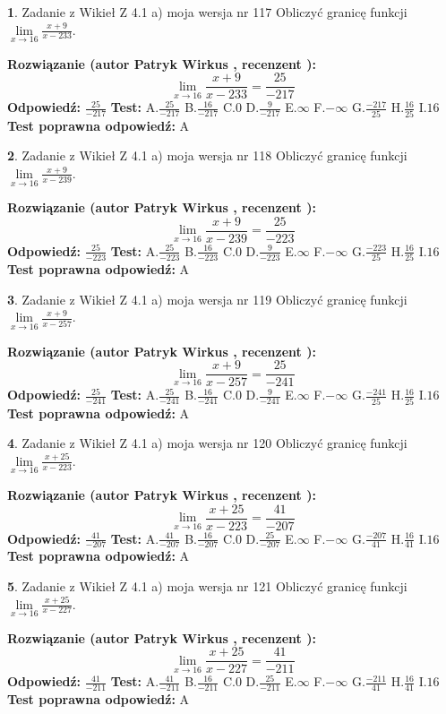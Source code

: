 \documentclass[12pt, a4paper]{article}
\theoremstyle{definition} %
\newtheorem{zad}{}
\newcommand{\zadStart}[1]{\begin{zad}#1\newline}
\newcommand{\zadStop}{\end{zad}}
\newcommand{\rozwStart}[2]{\noindent \textbf{Rozwiązanie (autor #1 , recenzent #2): }\newline}
\newcommand{\rozwStop}{\newline}
\newcommand{\odpStart}{\noindent \textbf{Odpowiedź:}\newline}
\newcommand{\odpStop}{\newline}
\newcommand{\testStart}{\noindent \textbf{Test:}\newline}
\newcommand{\testStop}{\newline}
\newcommand{\kluczStart}{\noindent \textbf{Test poprawna odpowiedź:}\newline}
\newcommand{\kluczStop}{\newline}
\begin{document}
\zadStart{Zadanie z Wikieł Z 4.1 a) moja wersja nr 117}
Obliczyć granicę funkcji $\lim\limits_{x\to16}\frac{x+9}{x-233}$.
\zadStop
\rozwStart{Patryk Wirkus}{}
$$\lim\limits_{x\to16}\frac{x+9}{x-233} = \frac{25}{-217}$$
\rozwStop
\odpStart
$\frac{25}{-217}$
\odpStop
\testStart
A.$\frac{25}{-217}$
B.$\frac{16}{-217}$
C.$0$
D.$\frac{9}{-217}$
E.$\infty$
F.$-\infty$
G.$\frac{-217}{25}$
H.$\frac{16}{25}$
I.$16$
\testStop
\kluczStart
A
\kluczStop



\zadStart{Zadanie z Wikieł Z 4.1 a) moja wersja nr 118}
Obliczyć granicę funkcji $\lim\limits_{x\to16}\frac{x+9}{x-239}$.
\zadStop
\rozwStart{Patryk Wirkus}{}
$$\lim\limits_{x\to16}\frac{x+9}{x-239} = \frac{25}{-223}$$
\rozwStop
\odpStart
$\frac{25}{-223}$
\odpStop
\testStart
A.$\frac{25}{-223}$
B.$\frac{16}{-223}$
C.$0$
D.$\frac{9}{-223}$
E.$\infty$
F.$-\infty$
G.$\frac{-223}{25}$
H.$\frac{16}{25}$
I.$16$
\testStop
\kluczStart
A
\kluczStop



\zadStart{Zadanie z Wikieł Z 4.1 a) moja wersja nr 119}
Obliczyć granicę funkcji $\lim\limits_{x\to16}\frac{x+9}{x-257}$.
\zadStop
\rozwStart{Patryk Wirkus}{}
$$\lim\limits_{x\to16}\frac{x+9}{x-257} = \frac{25}{-241}$$
\rozwStop
\odpStart
$\frac{25}{-241}$
\odpStop
\testStart
A.$\frac{25}{-241}$
B.$\frac{16}{-241}$
C.$0$
D.$\frac{9}{-241}$
E.$\infty$
F.$-\infty$
G.$\frac{-241}{25}$
H.$\frac{16}{25}$
I.$16$
\testStop
\kluczStart
A
\kluczStop



\zadStart{Zadanie z Wikieł Z 4.1 a) moja wersja nr 120}
Obliczyć granicę funkcji $\lim\limits_{x\to16}\frac{x+25}{x-223}$.
\zadStop
\rozwStart{Patryk Wirkus}{}
$$\lim\limits_{x\to16}\frac{x+25}{x-223} = \frac{41}{-207}$$
\rozwStop
\odpStart
$\frac{41}{-207}$
\odpStop
\testStart
A.$\frac{41}{-207}$
B.$\frac{16}{-207}$
C.$0$
D.$\frac{25}{-207}$
E.$\infty$
F.$-\infty$
G.$\frac{-207}{41}$
H.$\frac{16}{41}$
I.$16$
\testStop
\kluczStart
A
\kluczStop



\zadStart{Zadanie z Wikieł Z 4.1 a) moja wersja nr 121}
Obliczyć granicę funkcji $\lim\limits_{x\to16}\frac{x+25}{x-227}$.
\zadStop
\rozwStart{Patryk Wirkus}{}
$$\lim\limits_{x\to16}\frac{x+25}{x-227} = \frac{41}{-211}$$
\rozwStop
\odpStart
$\frac{41}{-211}$
\odpStop
\testStart
A.$\frac{41}{-211}$
B.$\frac{16}{-211}$
C.$0$
D.$\frac{25}{-211}$
E.$\infty$
F.$-\infty$
G.$\frac{-211}{41}$
H.$\frac{16}{41}$
I.$16$
\testStop
\kluczStart
A
\kluczStop
\end{document}
